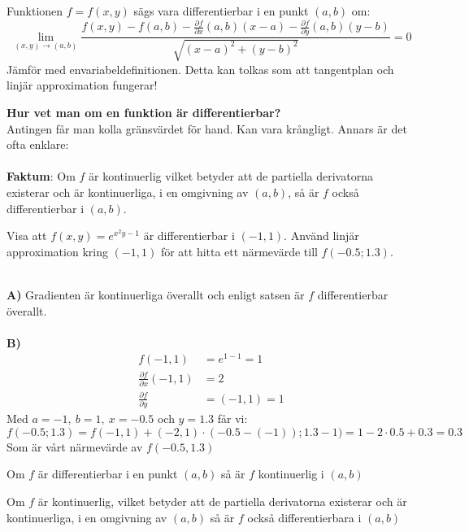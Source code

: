 \documentclass{report}
\begin{document}
{
Funktionen $ f = f(x,y) $ sägs vara differentierbar i en punkt $ (a,b) $ om:
\begin{equation*}
\lim_{(x,y) \to (a,b)} \frac{f(x,y)-f(a,b)- \frac{\partial f }{\partial x } (a,b)(x-a) - \frac{\partial f }{\partial y } (a,b)(y-b)}{ \sqrt{(x-a)^2 + (y-b)^2}   } = 0 
\end{equation*}
Jämför med envariabeldefinitionen. Detta kan tolkas som att tangentplan och linjär approximation fungerar!
}

\noindent
\textbf{Hur vet man om en funktion är differentierbar?}\\
Antingen får man kolla gränsvärdet för hand. Kan vara krångligt. Annars är det ofta enklare:\\\\

\noindent
\textbf{Faktum}: Om $ f $ är kontinuerlig vilket betyder att de partiella derivatorna existerar och är kontinuerliga, i en omgivning av $ (a,b) $, så är $ f $ också differentierbar i $ (a,b) $.

\qs{}
{
	Visa att $ f(x,y) = e^{x^2y-1} $ är differentierbar i $ (-1,1) $. Använd linjär approximation kring $ (-1,1) $ för att hitta ett närmevärde till $ f(-0.5;1.3) $.
}

\sol\\ 
\textbf{A)}  Gradienten är kontinuerliga överallt och enligt satsen är $ f $ differentierbar överallt.\\\\

\noindent
\textbf{B)}
\begin{align*}
	f(-1,1) &= e^{1-1} = 1\\
	\frac{\partial f }{\partial x } (-1,1) &= 2\\
	\frac{\partial f }{\partial y } &= (-1,1) = 1
\end{align*}
Med $ a = -1, \: b = 1, \: x = -0.5 $ och $ y = 1.3 $ får vi:
\begin{equation*}
f(-0.5; 1.3) = f(-1,1) + (-2,1) \cdot  (-0.5-(-1)); 1.3-1) = 1 -2 \cdot 0.5 + 0.3 = 0.3
\end{equation*}
Som är vårt närmevärde av $ f(-0.5, 1.3) $

\thm{}
{
Om $ f $ är differentierbar i en punkt $ (a,b) $ så är $ f $ kontinuerlig i $ (a,b) $  
}

\thm{}
{
Om $ f $ är kontinuerlig, vilket betyder att de partiella derivatorna existerar och är kontinuerliga, i en omgivning av $ (a,b) $ så är $ f $ också differentierbara i $ (a,b) $
}
\end{document}
